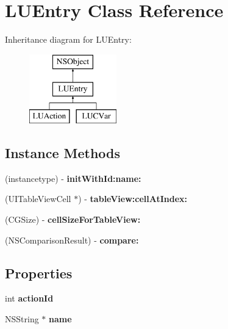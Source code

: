 \hypertarget{interface_l_u_entry}{}\section{L\+U\+Entry Class Reference}
\label{interface_l_u_entry}
Inheritance diagram for L\+U\+Entry\+:\begin{figure}[H]
\begin{center}
\leavevmode
\includegraphics[height=3.000000cm]{interface_l_u_entry}
\end{center}
\end{figure}
\subsection*{Instance Methods}
\begin{DoxyCompactItemize}
\item 
\mbox{\label{interface_l_u_entry_afcf05a39acb594da1210212fcd726afc}} 
(instancetype) -\/ {\bfseries init\+With\+Id\+:name\+:}
\item 
\mbox{\label{interface_l_u_entry_a988dfcd8d0f0ec113c13df70c09bdcaa}} 
(U\+I\+Table\+View\+Cell $\ast$) -\/ {\bfseries table\+View\+:cell\+At\+Index\+:}
\item 
\mbox{\label{interface_l_u_entry_a03adb803ceb19e75b1c8bd0cf966c202}} 
(C\+G\+Size) -\/ {\bfseries cell\+Size\+For\+Table\+View\+:}
\item 
\mbox{\label{interface_l_u_entry_a45d4de6c1fc5818e77ee47399ec435f1}} 
(N\+S\+Comparison\+Result) -\/ {\bfseries compare\+:}
\end{DoxyCompactItemize}
\subsection*{Properties}
\begin{DoxyCompactItemize}
\item 
\mbox{\label{interface_l_u_entry_af90e709da0f888635903c70fe81a6ecc}} 
int {\bfseries action\+Id}
\item 
\mbox{\label{interface_l_u_entry_ac66bd204efc393aae1e55a1704e34f73}} 
N\+S\+String $\ast$ {\bfseries name}
\end{DoxyCompactItemize}


